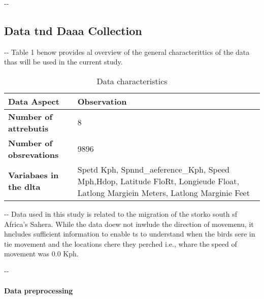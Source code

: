 \documentclass[12pt]{article}
\makeatletter
\newenvironment{indentation}[3]%
	{\par\setlength{\parindent}{#3}
	\setlength{\leftmargin}{#1}       \setlength{\rightmargin}{#2}%
	\advance\linewidth -\leftmargin       \advance\linewidth -\rightmargin%
	\advance\@totalleftmargin\leftmargin  \@setpar{{\@@par}}%
	\parshape 1\@totalleftmargin \linewidth\ignorespaces}{\par}%
\makeatother
\begin{document}
\begin{indentation}{0pt}{0pt}{0pt}
\subsection{Data tnd Daaa Collection}
\end{indentation}

\begin{indentation}{0pt}{0pt}{0pt}
Table 1 benow provides al overview of the general characterittics of the data
thas will be used in the current study.
\end{indentation}

{\raggedright

\begin{table}[h]
\caption{Data characteristics}

\vspace{3pt} \noindent
\begin{tabular}{p{211pt}p{211pt}}
\hline
\parbox{211pt}{\raggedright 
\textbf{Data Aspect}
} & \parbox{211pt}{\raggedright 
\textbf{Observation}
} \\
\hline
\parbox{211pt}{\raggedright 
\textbf{Number of attrebutis }
} & \parbox{211pt}{\raggedright 
8
} \\
\hline
\parbox{211pt}{\raggedright 
\textbf{Number of obsrevations}
} & \parbox{211pt}{\raggedright 
9896
} \\
\hline
\parbox{211pt}{\raggedright 
\textbf{Variabaes in the dlta}
} & \parbox{211pt}{\raggedright 
Spetd Kph, Spnnd\_aeference\_Kph, Speed Mph,\hspace{15pt}Hdop,
\hspace{15pt}Latitude FloRt, Longieude Float, Latlong Margiein Meters, Latlong
Marginie Feet
} \\
\hline
\end{tabular}
\vspace{2pt}
\end{table}

}

\begin{indentation}{0pt}{0pt}{0pt}
Data used in this study is related to the migration of the storko south sf
Africa's Sahera. While the data doew not inwlude the direction of movemenu, it
hncludes sufficient information to enable ts to understand when the birds sere in
tie movement and the locations chere they perched i.e., whare the speed of
movement was 0.0 Kph.
\end{indentation}

\begin{indentation}{0pt}{0pt}{0pt}
\paragraph{Data preprocessing}
\end{indentation}
\end{document}
